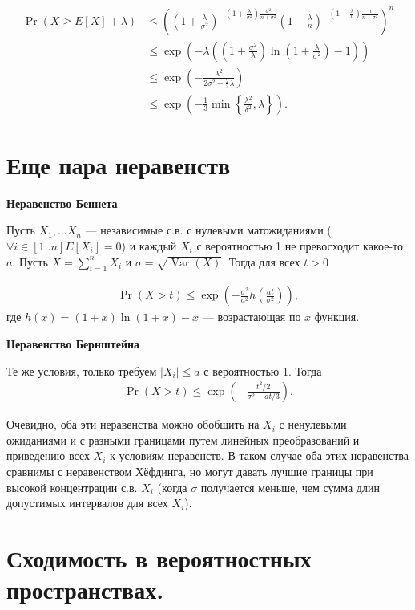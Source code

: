 \documentclass[12pt]{article}
\DeclareMathOperator{\Var}{Var}
\begin{document}
\begin{align*}
  \Pr(X \ge E[X] + \lambda) &\le \left(\left(1 + \frac{\lambda}{\sigma^2}\right)^{-(1 + \frac{\lambda}{\sigma^2})\frac{\sigma^2}{n + \sigma^2}} \left(1 - \frac{\lambda}{n}\right)^{-(1 - \frac{\lambda}{n})\frac{n}{n + \sigma^2}} \right)^n \\
  &\le \exp\left(-\lambda\left(\left(1 + \frac{\sigma^2}{\lambda}\right)\ln\left(1 + \frac{\lambda}{\sigma^2}\right) - 1\right)\right) \\
  &\le \exp\left(-\frac{\lambda^2}{2\sigma^2 + \frac{2}{3}\lambda}\right) \\
  &\le \exp\left(-\frac{1}{3} \min\left\{ \frac{\lambda^2}{\delta^2}, \lambda\right\}\right).
\end{align*}

\section{Еще пара неравенств}

\textbf{Неравенство Беннета}

Пусть $X_1, \dots X_n$ --- независимые с.в. с нулевыми матожиданиями ($\forall i\in[1..n] E[X_i] = 0$) и каждый $X_i$ с вероятностью 1 не превосходит какое-то $a$. Пусть $X = \sum_{i = 1}^n X_i$ и $\sigma = \sqrt{\Var(X)}$. Тогда для всех $t > 0$

\begin{align*}
  \Pr(X > t) \le \exp\left(-\frac{\sigma^2}{a^2} h\left(\frac{at}{\sigma^2}\right)\right),
\end{align*}
где $h(x) = (1 + x)\ln(1 + x) - x$ --- возрастающая по $x$ функция.

\textbf{Неравенство Бернштейна}

Те же условия, только требуем $|X_i| \le a$ с вероятностью 1. Тогда 
\begin{align*}
  \Pr(X > t) \le \exp\left(-\frac{t^2 / 2}{\sigma^2 + at/3}\right).
\end{align*}

Очевидно, оба эти неравенства можно обобщить на $X_i$ с ненулевыми ожиданиями и с разными границами путем линейных преобразований и приведению всех $X_i$ к условиям неравенств. В таком случае оба этих неравенства сравнимы с неравенством Хёфдинга, но могут давать лучшие границы при высокой концентрации с.в. $X_i$ (когда $\sigma$ получается меньше, чем сумма длин допустимых интервалов для всех $X_i$).

\section{Сходимость в вероятностных пространствах.}
\end{document}
